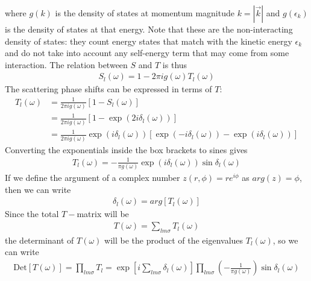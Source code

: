 \documentclass[twoside,11pt]{report}
\numberwithin{equation}{section}
\begin{document}
where \(g(k)\) is the density of states at momentum magnitude \(k = |\vec k|\) and \(g(\epsilon_k)\) is the density of states at that energy. Note that these are the non-interacting density of states: they count energy states that match with the kinetic energy \(\epsilon_k\) and do not take into account any self-energy term that may come from some interaction. The relation between \(S\) and \(T\) is thus
\begin{equation}\begin{aligned}
	\label{S_in_T}
	S_l(\omega) = 1 - 2 \pi i g(\omega) T_l(\omega)
\end{aligned}\end{equation}
The scattering phase shifts can be expressed in terms of \(T\):
\begin{equation}\begin{aligned}
	T_l(\omega) &= \frac{1}{2\pi i g(\omega)}\left[ 1 - S_l(\omega) \right]\\
		    &= \frac{1}{2\pi i g(\omega)}\left[1 - \exp\left( 2 i \delta_l(\omega) \right)\right]\\
		    &=\frac{1}{2\pi i g(\omega)}\exp\left(i \delta_l(\omega) \right)\left[\exp\left( - i \delta_l(\omega) \right) - \exp\left(i \delta_l(\omega) \right)\right]
\end{aligned}\end{equation}
Converting the exponentials inside the box brackets to sines gives
\begin{equation}\begin{aligned}
	\label{tmatphase}
	T_l(\omega) = -\frac{1}{\pi g(\omega)}\exp\left(i \delta_l(\omega) \right)\sin \delta_l(\omega)
\end{aligned}\end{equation}
If we define the argument of a complex number \(z(r,\phi) = r e^{i\phi}\) as \(arg(z) = \phi\), then we can write
\begin{equation}\begin{aligned}
	\delta_l(\omega) = arg\left[ T_l(\omega) \right] 
\end{aligned}\end{equation}
Since the total \(T-\)matrix will be 
\begin{equation}\begin{aligned}
	T(\omega) = \sum_{lm\sigma} T_l(\omega)
\end{aligned}\end{equation}
the determinant of \(T(\omega)\) will be the product of the eigenvalues \(T_l(\omega)\), so we can write
\begin{equation}\begin{aligned}
	\text{Det}\left[ T(\omega) \right] = \prod_{lm\sigma} T_l = \exp\left[ i\sum_{lm\sigma} \delta_l(\omega) \right] \prod_{lm\sigma}\left( -\frac{1}{\pi g(\omega)}\right)\sin \delta_l(\omega)
\end{aligned}\end{equation}
\end{document}
